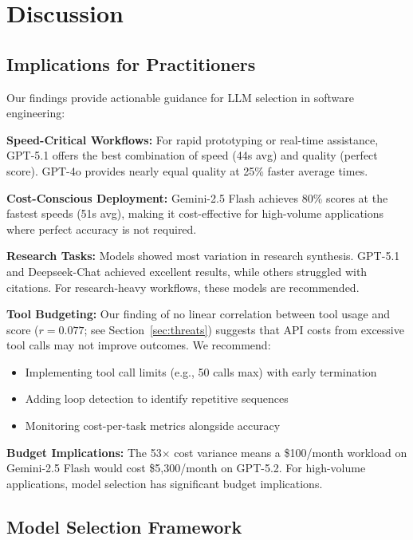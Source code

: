 \section{Discussion}
\label{sec:discussion}

\subsection{Implications for Practitioners}

Our findings provide actionable guidance for LLM selection in software engineering:

\textbf{Speed-Critical Workflows:} For rapid prototyping or real-time assistance, GPT-5.1 offers the best combination of speed (44s avg) and quality (perfect score). GPT-4o provides nearly equal quality at 25\% faster average times.

\textbf{Cost-Conscious Deployment:} Gemini-2.5 Flash achieves 80\% scores at the fastest speeds (51s avg), making it cost-effective for high-volume applications where perfect accuracy is not required.

\textbf{Research Tasks:} Models showed most variation in research synthesis. GPT-5.1 and Deepseek-Chat achieved excellent results, while others struggled with citations. For research-heavy workflows, these models are recommended.

\textbf{Tool Budgeting:} Our finding of no linear correlation between tool usage and score ($r=0.077$; see Section~\ref{sec:threats}) suggests that API costs from excessive tool calls may not improve outcomes. We recommend:
\begin{itemize}
    \item Implementing tool call limits (e.g., 50 calls max) with early termination
    \item Adding loop detection to identify repetitive sequences
    \item Monitoring cost-per-task metrics alongside accuracy
\end{itemize}

\textbf{Budget Implications:} The 53$\times$ cost variance means a \$100/month workload on Gemini-2.5 Flash would cost \$5,300/month on GPT-5.2. For high-volume applications, model selection has significant budget implications.

\subsection{Model Selection Framework}
\label{sec:selection}

